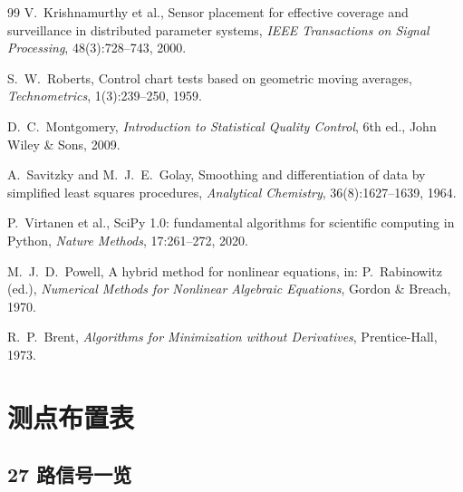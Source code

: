 \documentclass[11pt,a4paper]{ctexart}
\begin{document}
\begin{thebibliography}{99}
V.~Krishnamurthy et al.,
\newblock Sensor placement for effective coverage and surveillance in distributed parameter systems,
\newblock \emph{IEEE Transactions on Signal Processing}, 48(3):728--743, 2000.

S.~W.~Roberts,
\newblock Control chart tests based on geometric moving averages,
\newblock \emph{Technometrics}, 1(3):239--250, 1959.

D.~C.~Montgomery,
\newblock \emph{Introduction to Statistical Quality Control},
\newblock 6th ed., John Wiley \& Sons, 2009.

A.~Savitzky and M.~J.~E.~Golay,
\newblock Smoothing and differentiation of data by simplified least squares procedures,
\newblock \emph{Analytical Chemistry}, 36(8):1627--1639, 1964.

P.~Virtanen et al.,
\newblock SciPy 1.0: fundamental algorithms for scientific computing in Python,
\newblock \emph{Nature Methods}, 17:261--272, 2020.

M.~J.~D.~Powell,
\newblock A hybrid method for nonlinear equations,
\newblock in: P.~Rabinowitz (ed.), \emph{Numerical Methods for Nonlinear Algebraic Equations}, Gordon \& Breach, 1970.

R.~P.~Brent,
\newblock \emph{Algorithms for Minimization without Derivatives},
\newblock Prentice-Hall, 1973.

\end{thebibliography}

\appendix
\renewcommand{\thesection}{附录~\Alph{section}}
\renewcommand{\thesubsection}{\Alph{section}.\arabic{subsection}}

\section{测点布置表}\label{app:sensors}

\subsection{27 路信号一览}
\end{document}
